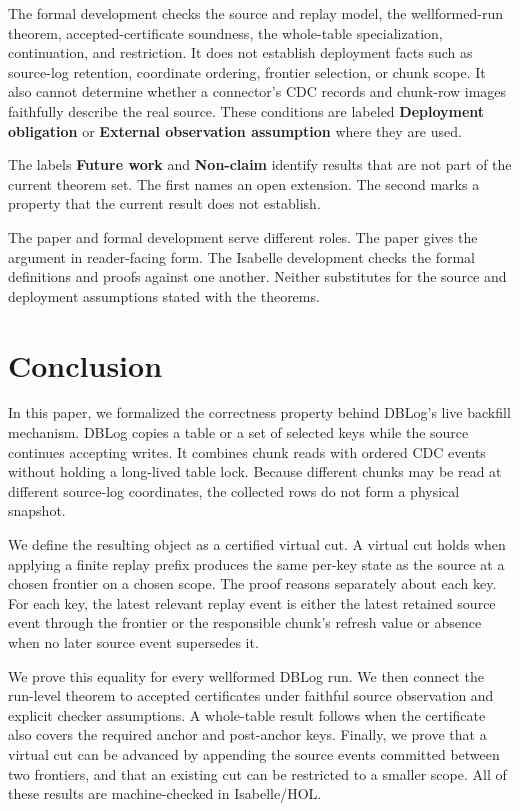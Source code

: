 \documentclass[letterpaper,10pt,twocolumn]{article}
\begin{document}
The formal development checks the source and replay model, the
wellformed-run theorem, accepted-certificate soundness, the whole-table
specialization, continuation, and restriction. It does not establish
deployment facts such as source-log retention, coordinate ordering,
frontier selection, or chunk scope. It also cannot determine whether a
connector's CDC records and chunk-row images faithfully describe the
real source. These conditions are labeled \textbf{Deployment
obligation} or \textbf{External observation assumption} where they are
used.

The labels \textbf{Future work} and \textbf{Non-claim} identify results
that are not part of the current theorem set. The first names an open
extension. The second marks a property that the current result does not
establish.

The paper and formal development serve different roles. The paper gives
the argument in reader-facing form. The Isabelle development checks the
formal definitions and proofs against one another. Neither substitutes
for the source and deployment assumptions stated with the theorems.

\section{Conclusion}\label{conclusion}

In this paper, we formalized the correctness property behind DBLog's
live backfill mechanism. DBLog copies a table or a set of selected keys
while the source continues accepting writes. It combines chunk reads
with ordered CDC events without holding a long-lived table lock.
Because different chunks may be read at different
source-log coordinates, the collected rows do not form a physical
snapshot.

We define the resulting object as a certified virtual cut. A virtual
cut holds when applying a finite replay prefix produces the same per-key
state as the source at a chosen frontier on a chosen scope. The proof
reasons separately about each key. For each key, the latest relevant
replay event is
either the latest retained source event through the frontier or the
responsible chunk's refresh value or absence when no later source event
supersedes it.

We prove this equality for every wellformed DBLog run. We then connect
the run-level theorem to accepted certificates under faithful source
observation and explicit checker assumptions. A whole-table result
follows when the certificate also covers the required anchor and
post-anchor keys. Finally, we prove that a virtual cut can be advanced
by appending the source events committed between two frontiers, and
that an existing cut can be restricted to a smaller scope. All of these
results are machine-checked in Isabelle/HOL.
\end{document}
